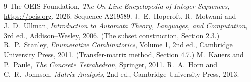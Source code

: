 \documentclass[11pt,a4paper]{article}
\theoremstyle{plain}
\theoremstyle{definition}
\begin{document}
\begin{thebibliography}{9}
 The OEIS Foundation, \emph{The On-Line Encyclopedia of Integer
Sequences}, \url{https://oeis.org}, 2026. Sequence A219589.
 J.~E.~Hopcroft, R.~Motwani and J.~D.~Ullman, \emph{Introduction to Automata
Theory, Languages, and Computation}, 3rd ed., Addison--Wesley, 2006. (The subset
construction, Section 2.3.)
 R.~P.~Stanley, \emph{Enumerative Combinatorics}, Volume 1, 2nd ed.,
Cambridge University Press, 2011. (Transfer-matrix method, Section 4.7.)
 M.~Kauers and P.~Paule, \emph{The Concrete Tetrahedron}, Springer, 2011.
 R.~A.~Horn and C.~R.~Johnson, \emph{Matrix Analysis}, 2nd ed., Cambridge
University Press, 2013.
\end{thebibliography}
\end{document}

